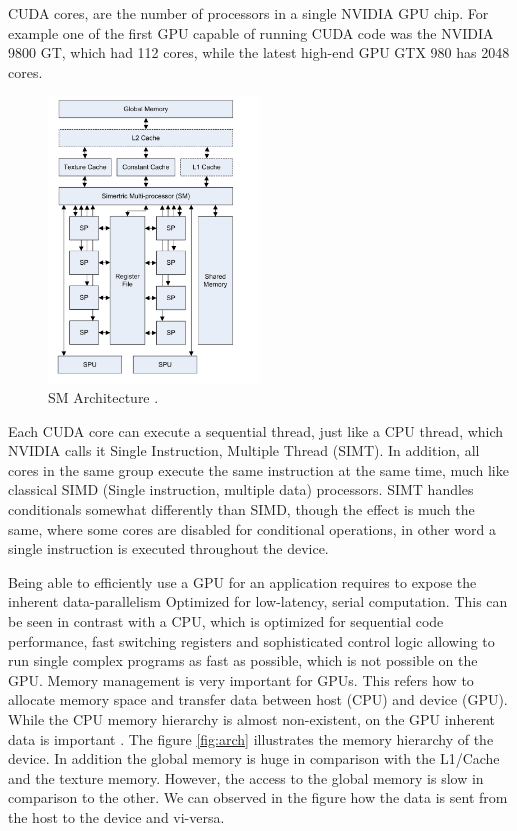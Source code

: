 CUDA cores, are the number of processors in a single NVIDIA GPU chip. For example one of the first GPU capable of running CUDA code was the NVIDIA 9800 GT, which had 112 cores, while the latest high-end GPU GTX 980 has 2048 cores.

\begin{figure}[htbp]
	\centering
		\includegraphics[width=0.5\textwidth]{Figures/GPU_CPU.png}
		\smallskip
	\caption[Architecture of NVIDIA's SM]{SM Architecture \cite{cook}.}
	\label{fig:gpu_cpu}
\end{figure}


Each CUDA core can execute a sequential thread, just like a CPU thread, which NVIDIA calls it Single Instruction, Multiple Thread (SIMT). In addition, all cores in the same group execute the same instruction at the same time, much like classical SIMD (Single instruction, multiple data) processors. SIMT handles conditionals somewhat differently than SIMD, though the effect is much the same, where some cores are disabled for conditional operations, in other word a single instruction is executed throughout the device.

Being able to efficiently use a GPU for an application requires to expose the inherent data-parallelism Optimized for low-latency, serial computation. This can be seen in contrast with a CPU, which is optimized for sequential code performance, fast switching registers  and sophisticated control logic allowing to run single complex programs as fast as possible, which is not possible on the GPU. Memory management is very important for GPUs. This refers how to allocate memory space and transfer data between host (CPU) and device (GPU). While the CPU memory hierarchy is almost non-existent, on the GPU inherent data is important \cite{hwu}. The figure \ref{fig:arch} illustrates the memory hierarchy of the device. In addition the global memory is huge in comparison with the L1/Cache and the texture memory. However, the access to the global memory is slow in comparison to the other. We can observed in the figure how the data is sent from the host to the device and vi-versa.

